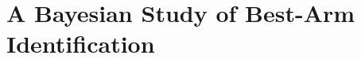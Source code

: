 
\chapter{A Bayesian Study of Best-Arm Identification}\label{CHAP:T3C}
	\minitoc
	\newpage



















% 
% 
